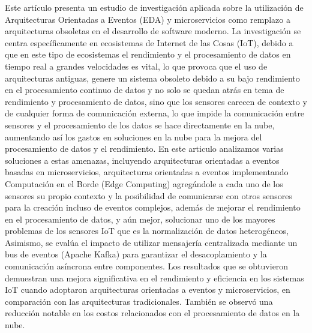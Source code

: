 Este artículo presenta un estudio de investigación aplicada sobre la utilización de Arquitecturas Orientadas a Eventos (EDA) y microservicios como remplazo a arquitecturas obsoletas en el desarrollo de software moderno. La investigación se centra específicamente en ecosistemas de Internet de las Cosas (IoT), debido a que en este tipo de ecosistemas el rendimiento y el procesamiento de datos en tiempo real a grandes velocidades es vital, lo que provoca que el uso de arquitecturas antiguas, genere un sistema obsoleto debido a su bajo rendimiento en el procesamiento continuo de datos y no solo se quedan atrás en tema de rendimiento y procesamiento de datos, sino que los sensores carecen de contexto y de cualquier forma de comunicación externa, lo que impide la comunicación entre sensores y el procesamiento de los datos se hace directamente en la nube, aumentando así los gastos en soluciones en la nube para la mejora del procesamiento de datos y el rendimiento. En este articulo analizamos varias soluciones a estas amenazas, incluyendo arquitecturas orientadas a eventos basadas en microservicios, arquitecturas orientadas a eventos implementando Computación en el Borde (Edge Computing) agregándole a cada uno de los sensores su propio contexto y la posibilidad de comunicarse con otros sensores para la creación incluso de eventos complejos, además de mejorar el rendimiento en el procesamiento de datos, y aún mejor, solucionar uno de los mayores problemas de los sensores IoT que es la normalización de datos heterogéneos, Asimismo, se evalúa el impacto de utilizar mensajería centralizada mediante un bus de eventos (Apache Kafka) para garantizar el desacoplamiento y la comunicación asíncrona entre componentes. Los resultados que se obtuvieron demuestran una mejora significativa en el rendimiento y eficiencia en los sistemas IoT cuando adoptaron arquitecturas orientadas a eventos y microservicios, en comparación con las arquitecturas tradicionales. También se observó una reducción notable en los costos relacionados con el procesamiento de datos en la nube.